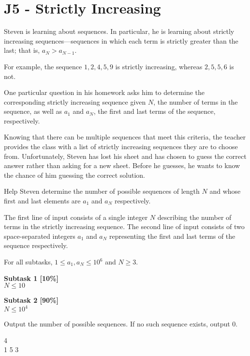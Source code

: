 \section*{J5 - Strictly Increasing}
Steven is learning about sequences. In particular, he is learning about strictly increasing sequences—sequences in which each term is strictly greater than the last; that is, $a_N>a_{N−1}$.

For example, the sequence $1,2,4,5,9$ is strictly increasing, whereas $2,5,5,6$ is not.

One particular question in his homework asks him to determine the corresponding strictly increasing sequence given $N$, the number of terms in the sequence, as well as $a_1$ and $a_N$, the first and last terms of the sequence, respectively.

Knowing that there can be multiple sequences that meet this criteria, the teacher provides the class with a list of strictly increasing sequences they are to choose from. Unfortunately, Steven has lost his sheet and has chosen to guess the correct answer rather than asking for a new sheet. Before he guesses, he wants to know the chance of him guessing the correct solution.

Help Steven determine the number of possible sequences of length $N$ and whose first and last elements are $a_1$ and $a_N$ respectively.

The first line of input consists of a single integer $N$ describing the number of terms in the strictly increasing sequence. The second line of input consists of two space-separated integers $a_1$ and $a_N$ representing the first and last terms of the sequence respectively.

\constraints
For all subtasks, $1 \leq a_1, a_N \leq 10^6$ and $N \geq 3$.

\textbf{Subtask 1 [10\%]} \\
$N \leq 10$ 

\textbf{Subtask 2 [90\%]} \\
$N \leq 10^4$

\outputformat
Output the number of possible sequences. If no such sequence exists, output $0$.

\addsample
{
    4 \\
    1 5
}
{
    3
}